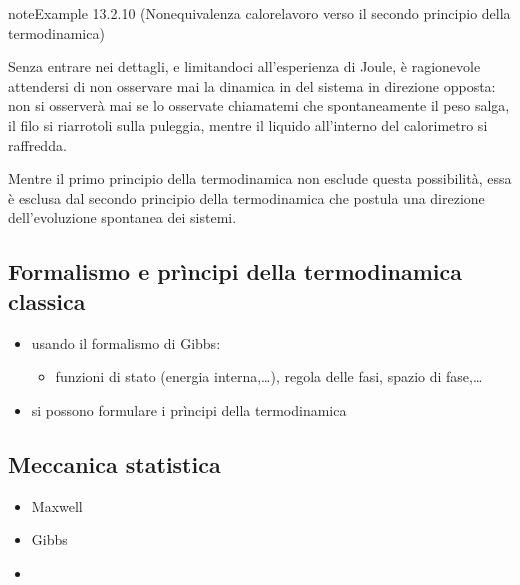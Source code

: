 \documentclass[letterpaper,10pt,italian]{jupyterBook}
\begin{document}
\begin{sphinxadmonition}{note}{Example 13.2.10 (Non\sphinxhyphen{}equivalenza calore\sphinxhyphen{}lavoro \sphinxhyphen{} verso il secondo principio della termodinamica)}



\sphinxAtStartPar
Senza entrare nei dettagli, e limitandoci all’esperienza di Joule, è ragionevole attendersi di non osservare mai la dinamica in del sistema in direzione opposta: non si osserverà mai \sphinxhyphen{} se lo osservate chiamatemi \sphinxhyphen{} che spontaneamente il peso salga, il filo si ri\sphinxhyphen{}arrotoli sulla puleggia, mentre il liquido all’interno del calorimetro si raffredda.

\sphinxAtStartPar
Mentre il primo principio della termodinamica non esclude questa possibilità, essa è esclusa dal secondo principio della termodinamica che postula una direzione dell’evoluzione spontanea dei sistemi.
\end{sphinxadmonition}


\subsection{Formalismo e prìncipi della termodinamica classica}
\label{\detokenize{ch/thermodynamics/foundation-experiments:formalismo-e-principi-della-termodinamica-classica}}\label{\detokenize{ch/thermodynamics/foundation-experiments:physics-hs-thermodynamics-foundation-experiments-gibbs}}
\sphinxAtStartPar
{}
\begin{itemize}
\item {} 
\sphinxAtStartPar
usando il formalismo di Gibbs:
\begin{itemize}
\item {} 
\sphinxAtStartPar
funzioni di stato (energia interna,…), regola delle fasi, spazio di fase,…

\end{itemize}

\item {} 
\sphinxAtStartPar
si possono formulare i prìncipi della termodinamica

\end{itemize}


\subsection{Meccanica statistica}
\label{\detokenize{ch/thermodynamics/foundation-experiments:meccanica-statistica}}\label{\detokenize{ch/thermodynamics/foundation-experiments:physics-hs-thermodynamics-foundation-experiments-stat-mech}}\begin{itemize}
\item {} 
\sphinxAtStartPar
Maxwell

\item {} 
\sphinxAtStartPar
Gibbs

\item {} 
\sphinxAtStartPar
{}

\end{itemize}
\end{document}
